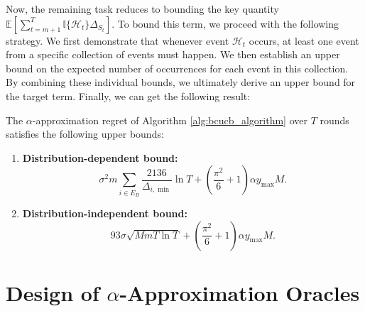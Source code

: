 \documentclass[opre,sglanonrev]{informs4}
\begin{document}
Now, the remaining task reduces to bounding the key quantity \(\mathbb{E}\left[\sum_{t=m+1}^{T} \mathbb{I}\{\mathcal{H}_t\} \Delta_{S_t}\right]\). To bound this term, we proceed with the following strategy. We first demonstrate that whenever event \(\mathcal{H}_t\) occurs, at least one event from a specific collection of events must happen. We then establish an upper bound on the expected number of occurrences for each event in this collection. By combining these individual bounds, we ultimately derive an upper bound for the target term. Finally, we can get the following result:

\begin{theorem}
\label{thm:regret_bound}
The $\alpha$-approximation regret of Algorithm \ref{alg:bcucb_algorithm} over $T$ rounds satisfies the following upper bounds:
\begin{enumerate}
    \item \textbf{Distribution-dependent bound:}
    $$
    \sigma^2 m \sum_{i \in E_B} \frac{2136}{\Delta_{i,\min}} \ln T + \left(\frac{\pi^2}{6} + 1\right) \alpha y_{\text{max}} M.
    $$
    
    \item \textbf{Distribution-independent bound:}
    $$
    93\sigma \sqrt{M m T \ln T} + \left(\frac{\pi^2}{6} + 1\right) \alpha y_{\text{max}} M.
    $$
\end{enumerate}
\end{theorem}


\section{Design of $\alpha$-Approximation Oracles}
\label{oracle}
\end{document}
